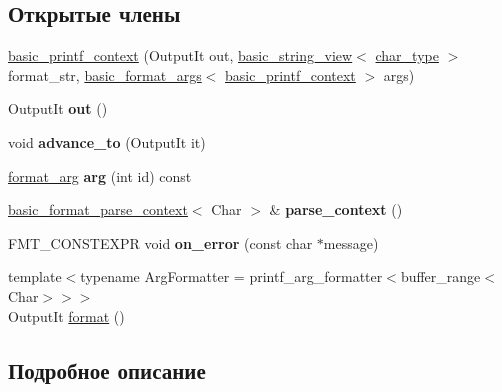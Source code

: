 \subsection*{Открытые члены}
\begin{DoxyCompactItemize}
\item 
\hyperlink{classbasic__printf__context_a70fcf45d0076835d464b8f3fb0cd4e1c}{basic\+\_\+printf\+\_\+context} (Output\+It out, \hyperlink{classbasic__string__view}{basic\+\_\+string\+\_\+view}$<$ \hyperlink{classbasic__printf__context_a5ceea5767a393451e5a82b2b75a6f63e}{char\+\_\+type} $>$ format\+\_\+str, \hyperlink{classbasic__format__args}{basic\+\_\+format\+\_\+args}$<$ \hyperlink{classbasic__printf__context}{basic\+\_\+printf\+\_\+context} $>$ args)
\item 
\mbox{\label{classbasic__printf__context_a32ce7421f1cc208df2ddc815ee3701f4}} 
Output\+It {\bfseries out} ()
\item 
\mbox{\label{classbasic__printf__context_af9b59dfcc9a9022bbd2e22eacbed7239}} 
void {\bfseries advance\+\_\+to} (Output\+It it)
\item 
\mbox{\label{classbasic__printf__context_a9d938bba34fe8dda4296a4942f0e5da4}} 
\hyperlink{classbasic__format__arg}{format\+\_\+arg} {\bfseries arg} (int id) const
\item 
\mbox{\label{classbasic__printf__context_a24228a25378df32d300f58b603897e17}} 
\hyperlink{classbasic__format__parse__context}{basic\+\_\+format\+\_\+parse\+\_\+context}$<$ Char $>$ \& {\bfseries parse\+\_\+context} ()
\item 
\mbox{\label{classbasic__printf__context_a738f65c97827f7d57534c87f5b71903d}} 
F\+M\+T\+\_\+\+C\+O\+N\+S\+T\+E\+X\+PR void {\bfseries on\+\_\+error} (const char $\ast$message)
\item 
{\footnotesize template$<$typename Arg\+Formatter  = printf\+\_\+arg\+\_\+formatter$<$buffer\+\_\+range$<$\+Char$>$$>$$>$ }\\Output\+It \hyperlink{classbasic__printf__context_a931a0b93e495c59094d6d401d40b2921}{format} ()
\end{DoxyCompactItemize}


\subsection{Подробное описание}
